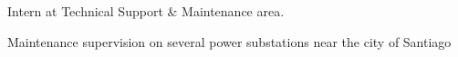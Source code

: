 Intern at Technical Support \& Maintenance area.
\begin{tightemize}
\item Maintenance supervision on several power substations near the city of Santiago
\end{tightemize}
\sectionsep